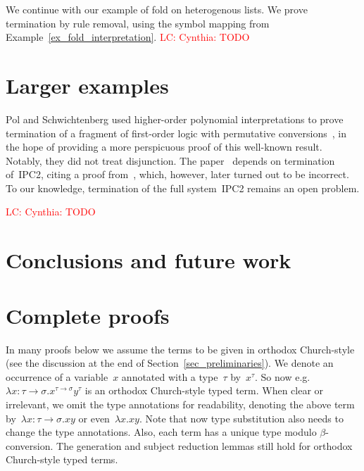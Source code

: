 \documentclass[a4paper,UKenglish,cleveref,autoref,numberwithinsect]{lipics-v2019}
\theoremstyle{definition}
\newcommand{\arrtype}{\rightarrow}
\newcommand{\LC}[1]{\textcolor{red}{LC: #1}}
\begin{document}
\begin{example}\label{ex_fold_orientation}
  We continue with our example of fold on heterogenous lists. We prove
  termination by rule removal, using the symbol mapping from
  Example~\ref{ex_fold_interpretation}. \LC{Cynthia: TODO}
\end{example}

\section{Larger examples}\label{sec:examples}

Pol and Schwichtenberg used higher-order polynomial interpretations to
prove termination of a fragment of first-order logic with permutative
conversions~\cite{PolSchwichtenberg1995}, in the hope of providing a
more perspicuous proof of this well-known result. Notably, they did
not treat disjunction. The paper~\cite{SorensenUrzyczyn2010} depends
on termination of~IPC2, citing a proof from~\cite{Wojdyga2008}, which,
however, later turned out to be incorrect. To our knowledge,
termination of the full system~IPC2 remains an open problem.

\LC{Cynthia: TODO}

\section{Conclusions and future work}



\clearpage
\appendix

\section{Complete proofs}\label{app_proofs}

In many proofs below we assume the terms to be given in orthodox
Church-style (see the discussion at the end of
Section~\ref{sec_preliminaries}). We denote an occurrence of a
variable~$x$ annotated with a type~$\tau$ by~$x^\tau$. So now
e.g.~$\lambda x : \tau\arrtype\sigma . x^{\tau\arrtype\sigma}y^\tau$
is an orthodox Church-style typed term. When clear or irrelevant, we
omit the type annotations for readability, denoting the above term
by~$\lambda x : \tau\arrtype\sigma . x y$ or even~$\lambda x . x
y$. Note that now type substitution also needs to change the type
annotations. Also, each term has a unique type modulo
$\beta$-conversion. The generation and subject reduction lemmas still
hold for orthodox Church-style typed terms.
\end{document}
